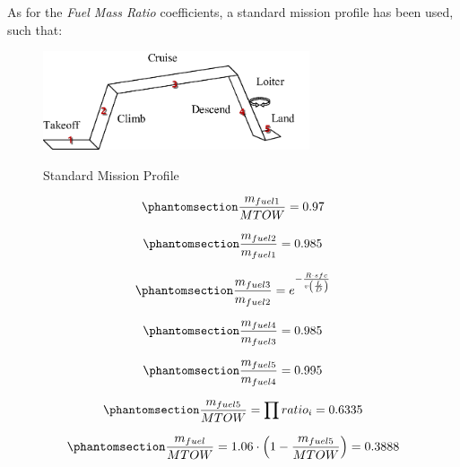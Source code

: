 \documentclass{article}
\begin{document}
As for the \textit{Fuel Mass Ratio} coefficients, a standard mission profile has been used, such that:

\begin{figure}[h!]
    \centering
    \includegraphics[width=0.7\textwidth]{Sources/Plots_and_Pictures/standard_mission_profile.png}
    \label{mission_profile}
    \caption{Standard Mission Profile \autocite{standardmission_profile}}
\end{figure}

\clearpage

\begin{equation}
    \phantomsection
    \label{fuel_mass_equation_phase1}
    \frac{m_{fuel1}}{MTOW} = 0.97
\end{equation}

\begin{equation}
    \phantomsection
    \label{fuel_mass_equation_phase2}
    \frac{m_{fuel2}}{m_{fuel1}} = 0.985
\end{equation}

\begin{equation}
    \phantomsection
    \label{fuel_mass_equation_phase3}
    \frac{m_{fuel3}}{m_{fuel2}} = e^{- \frac{R \cdot sfc}{v\left(\frac{L}{D}\right) }}
\end{equation}

\begin{equation}
    \phantomsection
    \label{fuel_mass_equation_phase4}
    \frac{m_{fuel4}}{m_{fuel3}} = 0.985
\end{equation}

\begin{equation}
    \phantomsection
    \label{fuel_mass_equation_phase5}
    \frac{m_{fuel5}}{m_{fuel4}} = 0.995
\end{equation}

\begin{equation}
    \phantomsection
    \label{fuel_mass_equation_final}
    \frac{m_{fuel5}}{MTOW} = \prod {ratio_i} = 0.6335
\end{equation}

\begin{equation}
    \phantomsection
    \label{fuel_mass_equation_final_corrected}
    \frac{m_{fuel}}{MTOW} = 1.06 \cdot \left(1 - \frac{m_{fuel5}}{MTOW}\right) = 0.3888 
\end{equation}
\end{document}
